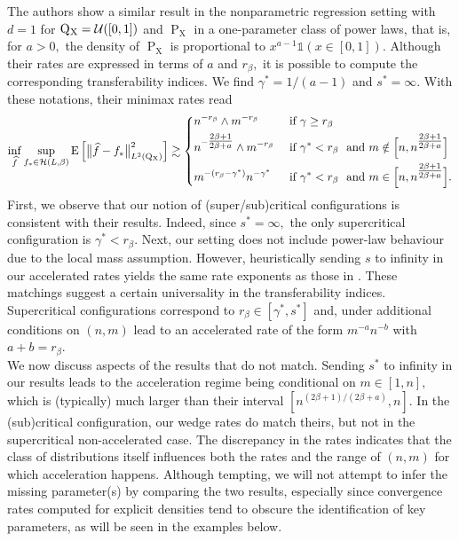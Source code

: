 \documentclass[10pt]{article}
\newcommand{\mH}{\mathcal{H}}
\newcommand{\mU}{\mathcal{U}}
\newcommand{\E}{\operatorname{E}}
\renewcommand{\P}{\operatorname{P}}
\newcommand{\Q}{\operatorname{Q}}
\newcommand{\wh}{\widehat}
\newcommand{\sX}{\mathrm{X}}
\begin{document}
The authors show a similar result in the nonparametric regression setting with $d=1$ for $\Q\mathstrut_{\!\sX} = \mU([0, 1])$ and $\P_{\sX}$ in a one-parameter class of power laws, that is, for $a > 0,$ the density of $\P_{\sX}$ is proportional to $x^{a - 1}\mathds{1}(x \in [0, 1]).$ Although their rates are expressed in terms of $a$ and $r_\beta,$ it is possible to compute the corresponding transferability indices. We find $\gamma^* = 1/(a - 1)$ and $s^* = \infty.$ With these notations, their minimax rates read
\begin{align*}
    \inf_{\wh f}\sup_{f_* \in \mH(L, \beta)}\E\Big[\big\|\wh f - f_*\big\|_{L^2(\Q\mathstrut_{\!\sX})}^2\Big] \gtrsim \begin{dcases}
        n^{-r_\beta}\wedge m^{-r_\beta} & \text{ if } \gamma \geq r_{\beta}\\
        n^{-\tfrac{2\beta + 1}{2\beta + a}}\wedge m^{-r_\beta} & \text{ if } \gamma^* < r_\beta \ \text{ and } m \notin \Big[n, n^{\tfrac{2\beta + 1}{2\beta + a}}\Big]\\
        m^{-(r_\beta-\gamma^*)}n^{-\gamma^*} & \text{ if } \gamma^* < r_\beta \ \text{ and } m \in \Big[n, n^{\tfrac{2\beta + 1}{2\beta + a}}\Big].
    \end{dcases}
\end{align*}
First, we observe that our notion of (super/sub)critical configurations is consistent with their results. Indeed, since $s^* = \infty,$ the only supercritical configuration is $\gamma^* < r_\beta.$ Next, our setting does not include power-law behaviour due to the local mass assumption. However, heuristically sending $s$ to infinity in our accelerated rates yields the same rate exponents as those in \cite{zhou2025synergistic}. These matchings suggest a certain universality in the transferability indices. Supercritical configurations correspond to $r_\beta \in [\gamma^*, s^*]$ and, under additional conditions on $(n,m)$ lead to an accelerated rate of the form $m^{-a}n^{-b}$ with $a + b = r_\beta.$\\

We now discuss aspects of the results that do not match. Sending $s^*$ to infinity in our results leads to the acceleration regime being conditional on $m \in [1, n],$ which is (typically) much larger than their interval $[n^{(2\beta + 1)/(2\beta + a)}, n].$ In the (sub)critical configuration, our wedge rates do match theirs, but not in the supercritical non-accelerated case. The discrepancy in the rates indicates that the class of distributions itself influences both the rates and the range of $(n,m)$ for which acceleration happens. Although tempting, we will not attempt to infer the missing parameter(s) by comparing the two results, especially since convergence rates computed for explicit densities tend to obscure the identification of key parameters, as will be seen in the examples below.\\
\end{document}
